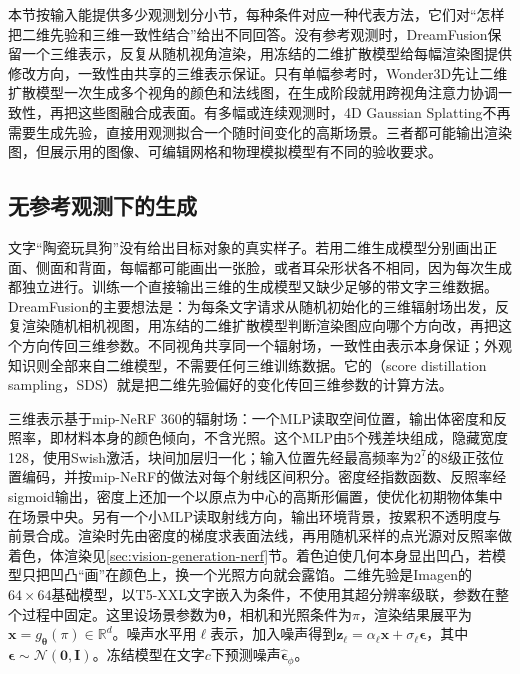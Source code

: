 本节按输入能提供多少观测划分小节，每种条件对应一种代表方法，它们对“怎样把二维先验和三维一致性结合”给出不同回答。没有参考观测时，DreamFusion保留一个三维表示，反复从随机视角渲染，用冻结的二维扩散模型给每幅渲染图提供修改方向，一致性由共享的三维表示保证。只有单幅参考时，Wonder3D先让二维扩散模型一次生成多个视角的颜色和法线图，在生成阶段就用跨视角注意力协调一致性，再把这些图融合成表面。有多幅或连续观测时，4D Gaussian Splatting不再需要生成先验，直接用观测拟合一个随时间变化的高斯场景。三者都可能输出渲染图，但展示用的图像、可编辑网格和物理模拟模型有不同的验收要求。

\subsection{无参考观测下的生成}
\label{sec:vision-multigen-no-reference}
\label{sec:vision-multigen-dreamfusion}

文字“陶瓷玩具狗”没有给出目标对象的真实样子。若用二维生成模型分别画出正面、侧面和背面，每幅都可能画出一张脸，或者耳朵形状各不相同，因为每次生成都独立进行。训练一个直接输出三维的生成模型又缺少足够的带文字三维数据。DreamFusion的主要想法是：为每条文字请求从随机初始化的三维辐射场出发，反复渲染随机相机视图，用冻结的二维扩散模型判断渲染图应向哪个方向改，再把这个方向传回三维参数。不同视角共享同一个辐射场，一致性由表示本身保证；外观知识则全部来自二维模型，不需要任何三维训练数据。它的（score distillation sampling，SDS）就是把二维先验偏好的变化传回三维参数的计算方法。

三维表示基于mip-NeRF 360的辐射场：一个MLP读取空间位置，输出体密度和反照率，即材料本身的颜色倾向，不含光照。这个MLP由5个残差块组成，隐藏宽度128，使用Swish激活，块间加层归一化；输入位置先经最高频率为$2^{7}$的8级正弦位置编码，并按mip-NeRF的做法对每个射线区间积分。密度经指数函数、反照率经sigmoid输出，密度上还加一个以原点为中心的高斯形偏置，使优化初期物体集中在场景中央。另有一个小MLP读取射线方向，输出环境背景，按累积不透明度与前景合成。渲染时先由密度的梯度求表面法线，再用随机采样的点光源对反照率做着色，体渲染见\ref{sec:vision-generation-nerf}节。着色迫使几何本身显出凹凸，若模型只把凹凸“画”在颜色上，换一个光照方向就会露馅。二维先验是Imagen的$64\times64$基础模型，以T5-XXL文字嵌入为条件，不使用其超分辨率级联，参数在整个过程中固定。这里设场景参数为$\bm\theta$，相机和光照条件为$\pi$，渲染结果展平为$\bm x=g_{\bm\theta}(\pi)\in\mathbb R^d$。噪声水平用$\ell$表示，加入噪声得到$\bm z_\ell=\alpha_\ell\bm x+\sigma_\ell\bm\epsilon$，其中$\bm\epsilon\sim\mathcal N(\bm0,\bm I)$。冻结模型在文字$c$下预测噪声$\widehat{\bm\epsilon}_\phi$。

